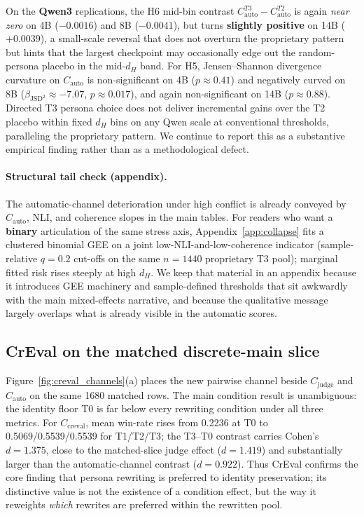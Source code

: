 \documentclass[sigconf,nonacm]{acmart}
\begin{document}
On the \textbf{Qwen3} replications, the H6 mid-bin contrast $C_{\mathrm{auto}}^{T3}{-}C_{\mathrm{auto}}^{T2}$ is again \emph{near zero} on 4B ($-0.0016$) and 8B ($-0.0041$), but turns \textbf{slightly positive} on 14B ($+0.0039$), a small-scale reversal that does not overturn the proprietary pattern but hints that the largest checkpoint may occasionally edge out the random-persona placebo in the mid-$d_H$ band. For H5, Jensen--Shannon divergence~\cite{lin1991} curvature on $C_{\mathrm{auto}}$ is non-significant on 4B ($p{\approx}0.41$) and negatively curved on 8B ($\beta_{\mathrm{JSD}^2}{\approx}{-}7.07$, $p{\approx}0.017$), and again non-significant on 14B ($p{\approx}0.88$). Directed T3 persona choice does not deliver incremental gains over the T2 placebo within fixed $d_H$ bins on any Qwen scale at conventional thresholds, paralleling the proprietary pattern. We continue to report this as a substantive empirical finding rather than as a methodological defect.

\paragraph{Structural tail check (appendix).}
The automatic-channel deterioration under high conflict is already conveyed by $C_{\mathrm{auto}}$, NLI, and coherence slopes in the main tables.
For readers who want a \textbf{binary} articulation of the same stress axis, Appendix~\ref{app:collapse} fits a clustered binomial GEE on a joint low-NLI-and-low-coherence indicator (sample-relative $q{=}0.2$ cut-offs on the same $n{=}1440$ proprietary T3 pool); marginal fitted risk rises steeply at high $d_H$.
We keep that material in an appendix because it introduces GEE machinery and sample-defined thresholds that sit awkwardly with the main mixed-effects narrative, and because the qualitative message largely overlaps what is already visible in the automatic scores.

\subsection{CrEval on the matched discrete-main slice}

Figure~\ref{fig:creval_channels}(a) places the new pairwise channel beside $C_{\mathrm{judge}}$ and $C_{\mathrm{auto}}$ on the same 1680 matched rows. The main condition result is unambiguous: the identity floor T0 is far below every rewriting condition under all three metrics. For $C_{\mathrm{creval}}$, mean win-rate rises from 0.2236 at T0 to 0.5069/0.5539/0.5539 for T1/T2/T3; the T3--T0 contrast carries Cohen's $d{=}1.375$, close to the matched-slice judge effect ($d{=}1.419$) and substantially larger than the automatic-channel contrast ($d{=}0.922$). Thus CrEval confirms the core finding that persona rewriting is preferred to identity preservation; its distinctive value is not the existence of a condition effect, but the way it reweights \emph{which} rewrites are preferred within the rewritten pool.
\end{document}

